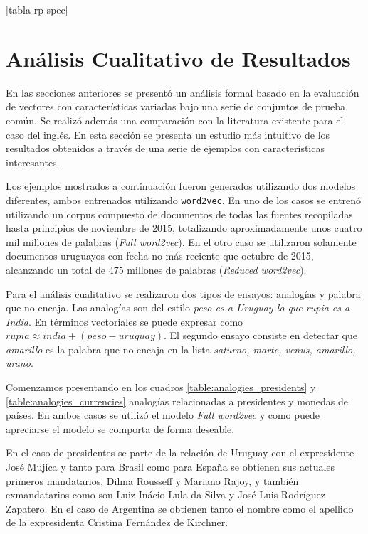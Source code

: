 [tabla rp-spec]


\section{Análisis Cualitativo de Resultados}

En las secciones anteriores se presentó un análisis formal basado en la evaluación de vectores con
características variadas bajo una serie de conjuntos de prueba común. Se realizó además
una comparación con la literatura existente para el caso del inglés. En esta sección se presenta
un estudio más intuitivo de los resultados obtenidos a través de una serie de ejemplos con
características interesantes.

Los ejemplos mostrados a continuación fueron generados utilizando dos modelos diferentes, ambos
entrenados utilizando \texttt{word2vec}. En uno de los casos se entrenó utilizando un corpus
compuesto de documentos de todas las fuentes recopiladas hasta principios de noviembre de 2015,
totalizando aproximadamente unos cuatro mil millones de palabras (\textit{Full word2vec}). En el
otro caso se utilizaron solamente documentos uruguayos con fecha no más reciente que octubre de
2015, alcanzando un total de 475 millones de palabras (\textit{Reduced word2vec}).

Para el análisis cualitativo se realizaron dos tipos de ensayos: analogías y palabra que no encaja. Las
analogías son del estilo \textit{peso es a Uruguay lo que rupia es a India}. En términos vectoriales
se puede expresar como $rupia \approx india + (peso - uruguay)$. El segundo ensayo consiste en
detectar que \textit{amarillo} es la palabra que no encaja en la lista \textit{saturno, marte, venus,
amarillo, urano}.

Comenzamos presentando en los cuadros \ref{table:analogies_presidents} y
\ref{table:analogies_currencies} analogías relacionadas a presidentes y monedas de países. En ambos
casos se utilizó el modelo \textit{Full word2vec} y como puede apreciarse el modelo se comporta de
forma deseable.

En el caso de presidentes se parte de la relación de Uruguay con el expresidente José Mujica y tanto
para Brasil como para España se obtienen sus actuales primeros mandatarios, Dilma Rousseff y
Mariano Rajoy, y también exmandatarios como son Luiz Inácio Lula da Silva y José Luis Rodríguez
Zapatero. En el caso de Argentina se obtienen tanto el nombre como el apellido de la expresidenta
Cristina Fernández de Kirchner.

